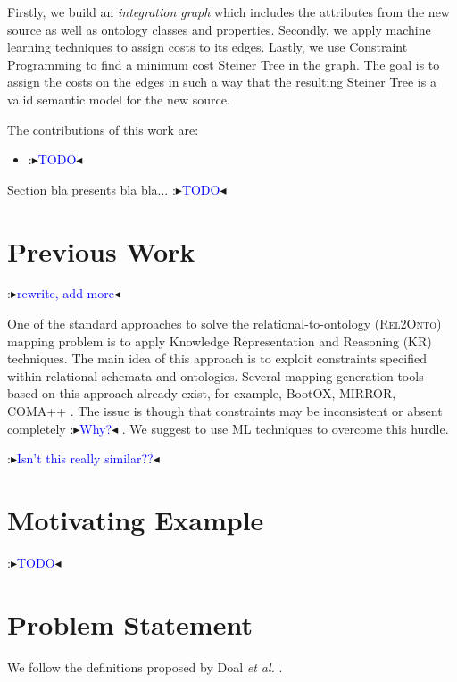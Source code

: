 \documentclass[letterpaper]{article} %
\newcommand{\authornote}[3]{
  {\fbox{\sc 
  #1}:$\blacktriangleright$\textcolor{#2}{\small{#3}}$\blacktriangleleft$}%
}
\newcommand{\ddg}[1]{\authornote{DDG}{blue}{#1}}
\newcommand{\relonto}{\textsc{Rel2Onto}}
\newcommand{\etal}{\textit{et al.}}
\begin{document}
Firstly, we build an \emph{integration graph} which includes the 
attributes from the new source as well as ontology classes and properties. 
Secondly, we apply machine learning techniques to 
assign costs to its edges. 
Lastly, we use Constraint Programming to 
find a minimum cost Steiner Tree in the graph. The goal is to assign the costs 
on the edges in such a way that the resulting Steiner Tree is a valid semantic 
model for the new source. 

The contributions of this work are:
\begin{itemize}
	\item \ddg{TODO}
\end{itemize}

Section bla  presents bla bla... \ddg{TODO}

\section{Previous Work}
\ddg{rewrite, add more}
One of the standard approaches to solve the relational-to-ontology (\relonto{})
mapping problem is to apply Knowledge Representation and Reasoning (KR)
techniques. The main idea of this approach is to exploit constraints specified 
within relational schemata and ontologies. Several mapping generation
tools based on this approach already exist, for example, BootOX, MIRROR,
COMA++ \cite{pinkel2016rodi}. The issue is though that constraints may be 
inconsistent or absent completely \ddg{Why?}. We suggest to use ML techniques 
to overcome this hurdle.

\cite{taheriyan2016learning} \ddg{Isn't this really similar??}

\section{Motivating Example}
\ddg{TODO}

\section{Problem Statement}
We follow the definitions proposed by Doal \etal{} \cite{doan2012principles}.
\end{document}
